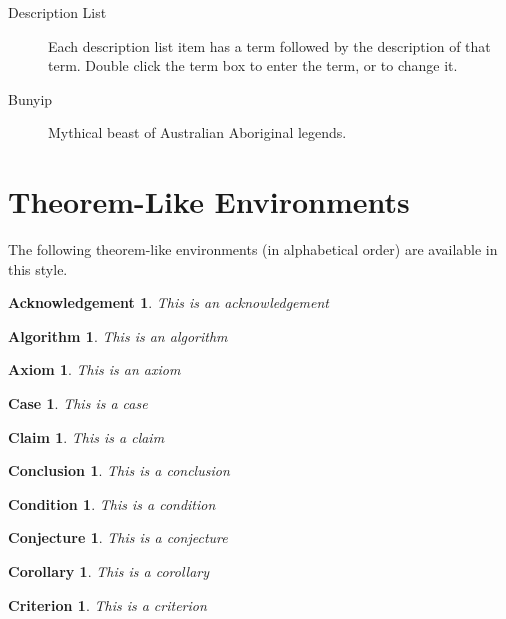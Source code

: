 \documentclass[11pt,spanish]{report}
\newtheorem{acknowledgement}[theorem]{Acknowledgement}
\newtheorem{algorithm}[theorem]{Algorithm}
\newtheorem{axiom}[theorem]{Axiom}
\newtheorem{case}[theorem]{Case}
\newtheorem{claim}[theorem]{Claim}
\newtheorem{conclusion}[theorem]{Conclusion}
\newtheorem{condition}[theorem]{Condition}
\newtheorem{conjecture}[theorem]{Conjecture}
\newtheorem{corollary}[theorem]{Corollary}
\newtheorem{criterion}[theorem]{Criterion}
\begin{document}
\begin{description}
\item[Description List] Each description list item has a term followed by the
description of that term. Double click the term box to enter the term, or to
change it.

\item[Bunyip] Mythical beast of Australian Aboriginal legends.
\end{description}

\section{Theorem-Like Environments}

The following theorem-like environments (in alphabetical order) are available
in this style.

\begin{acknowledgement}
This is an acknowledgement
\end{acknowledgement}

\begin{algorithm}
This is an algorithm
\end{algorithm}

\begin{axiom}
This is an axiom
\end{axiom}

\begin{case}
This is a case
\end{case}

\begin{claim}
This is a claim
\end{claim}

\begin{conclusion}
This is a conclusion
\end{conclusion}

\begin{condition}
This is a condition
\end{condition}

\begin{conjecture}
This is a conjecture
\end{conjecture}

\begin{corollary}
This is a corollary
\end{corollary}

\begin{criterion}
This is a criterion
\end{criterion}
\end{document}

